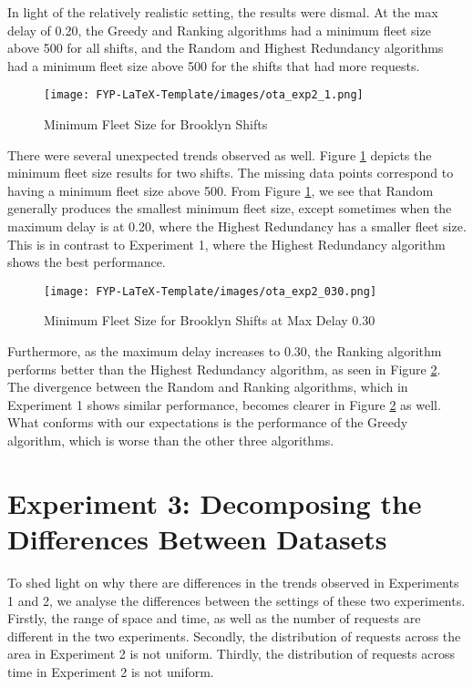\documentclass[urop]{socreport}
\begin{document}
In light of the relatively realistic setting, the results were dismal. At the max delay of 0.20, the Greedy and Ranking algorithms had a minimum fleet size above 500 for all shifts, and the Random and Highest Redundancy algorithms had a minimum fleet size above 500 for the shifts that had more requests.

\begin{figure}[h]
    \centering
    \texttt{[image: FYP-LaTeX-Template/images/ota\_exp2\_1.png]}
    \caption{Minimum Fleet Size for Brooklyn Shifts}
    \label{fig:exp2_multi}
\end{figure}

There were several unexpected trends observed as well. Figure \ref{fig:exp2_multi} depicts the minimum fleet size results for two shifts. The missing data points correspond to having a minimum fleet size above 500. From Figure \ref{fig:exp2_multi}, we see that Random generally produces the smallest minimum fleet size, except sometimes when the maximum delay is at 0.20, where the Highest Redundancy has a smaller fleet size. This is in contrast to Experiment 1, where the Highest Redundancy algorithm shows the best performance.

\begin{figure}[h]
    \centering
    \texttt{[image: FYP-LaTeX-Template/images/ota\_exp2\_030.png]}
    \caption{Minimum Fleet Size for Brooklyn Shifts at Max Delay 0.30}
    \label{fig:exp2_delay}
\end{figure}

Furthermore, as the maximum delay increases to 0.30, the Ranking algorithm performs better than the Highest Redundancy algorithm, as seen in Figure \ref{fig:exp2_delay}. The divergence between the Random and Ranking algorithms, which in Experiment 1 shows similar performance, becomes clearer in Figure \ref{fig:exp2_delay} as well. What conforms with our expectations is the performance of the Greedy algorithm, which is worse than the other three algorithms.

\section{Experiment 3: Decomposing the Differences Between Datasets}
To shed light on why there are differences in the trends observed in Experiments 1 and 2, we analyse the differences between the settings of these two experiments. Firstly, the range of space and time, as well as the number of requests are different in the two experiments. Secondly, the distribution of requests across the area in Experiment 2 is not uniform. Thirdly, the distribution of requests across time in Experiment 2 is not uniform.
\end{document}
